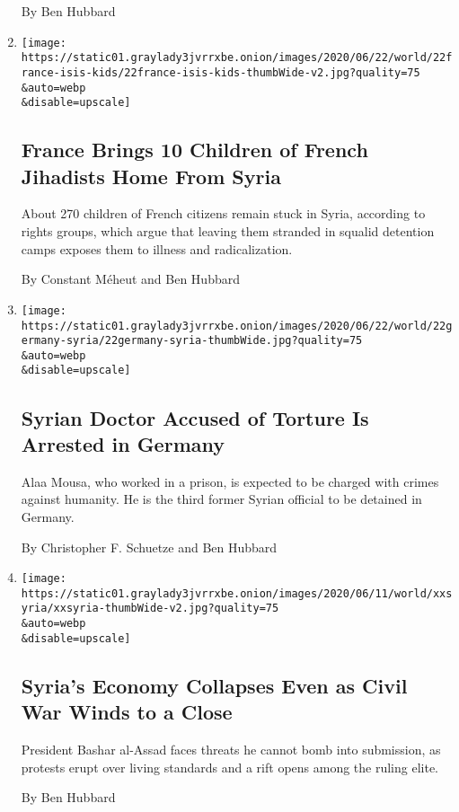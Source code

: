 \begin{enumerate}
  By Ben Hubbard
\item
  \href{/2020/06/22/world/europe/france-isis-children-repatriated.html}{}

  \texttt{[image: https://static01.graylady3jvrrxbe.onion/images/2020/06/22/world/22france-isis-kids/22france-isis-kids-thumbWide-v2.jpg?quality=75\\\&auto=webp\\\&disable=upscale]}

  \hypertarget{france-brings-10-children-of-french-jihadists-home-from-syria}{%
  \subsection{France Brings 10 Children of French Jihadists Home From
  Syria}\label{france-brings-10-children-of-french-jihadists-home-from-syria}}

  About 270 children of French citizens remain stuck in Syria, according
  to rights groups, which argue that leaving them stranded in squalid
  detention camps exposes them to illness and radicalization.

  By Constant Méheut and Ben Hubbard
\item
  \href{/2020/06/22/world/europe/syria-doctor-torture-germany.html}{}

  \texttt{[image: https://static01.graylady3jvrrxbe.onion/images/2020/06/22/world/22germany-syria/22germany-syria-thumbWide.jpg?quality=75\\\&auto=webp\\\&disable=upscale]}

  \hypertarget{syrian-doctor-accused-of-torture-is-arrested-in-germany}{%
  \subsection{Syrian Doctor Accused of Torture Is Arrested in
  Germany}\label{syrian-doctor-accused-of-torture-is-arrested-in-germany}}

  Alaa Mousa, who worked in a prison, is expected to be charged with
  crimes against humanity. He is the third former Syrian official to be
  detained in Germany.

  By Christopher F. Schuetze and Ben Hubbard
\item
  \href{/2020/06/15/world/middleeast/syria-economy-assad-makhlouf.html}{}

  \texttt{[image: https://static01.graylady3jvrrxbe.onion/images/2020/06/11/world/xxsyria/xxsyria-thumbWide-v2.jpg?quality=75\\\&auto=webp\\\&disable=upscale]}

  \hypertarget{syrias-economy-collapses-even-as-civil-war-winds-to-a-close}{%
  \subsection{Syria's Economy Collapses Even as Civil War Winds to a
  Close}\label{syrias-economy-collapses-even-as-civil-war-winds-to-a-close}}

  President Bashar al-Assad faces threats he cannot bomb into
  submission, as protests erupt over living standards and a rift opens
  among the ruling elite.

  By Ben Hubbard
\end{enumerate}

